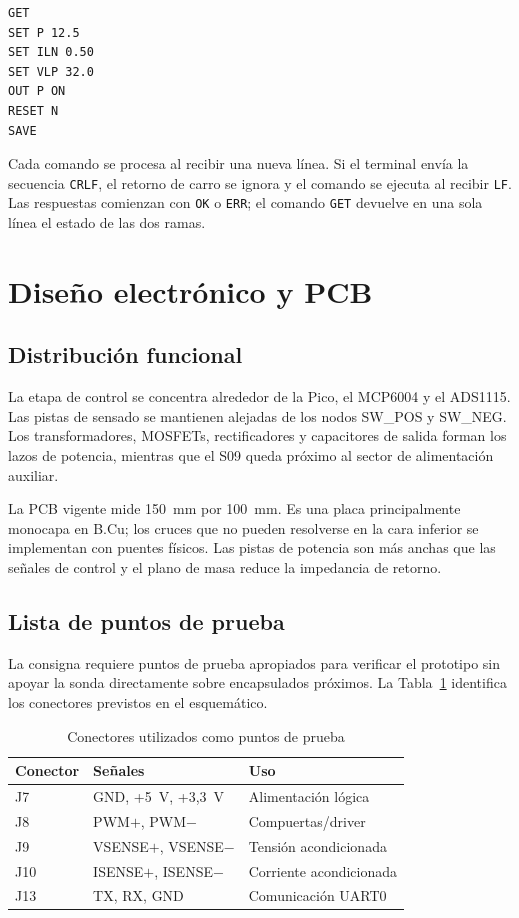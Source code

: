 \documentclass[conference]{IEEEtran}
\begin{document}
\begin{lstlisting}[caption={Ejemplos de comunicación con otra placa.}]
GET
SET P 12.5
SET ILN 0.50
SET VLP 32.0
OUT P ON
RESET N
SAVE
\end{lstlisting}

Cada comando se procesa al recibir una nueva línea. Si el terminal envía la secuencia \texttt{CRLF}, el retorno de carro se ignora y el comando se ejecuta al recibir \texttt{LF}. Las respuestas comienzan con \texttt{OK} o \texttt{ERR}; el comando \texttt{GET} devuelve en una sola línea el estado de las dos ramas.

\section{Diseño electrónico y PCB}

\subsection{Distribución funcional}

La etapa de control se concentra alrededor de la Pico, el MCP6004 y el ADS1115. Las pistas de sensado se mantienen alejadas de los nodos SW\_POS y SW\_NEG. Los transformadores, MOSFETs, rectificadores y capacitores de salida forman los lazos de potencia, mientras que el S09 queda próximo al sector de alimentación auxiliar.

La PCB vigente mide 150~mm por 100~mm. Es una placa principalmente monocapa en B.Cu; los cruces que no pueden resolverse en la cara inferior se implementan con puentes físicos. Las pistas de potencia son más anchas que las señales de control y el plano de masa reduce la impedancia de retorno.

\subsection{Lista de puntos de prueba}

La consigna requiere puntos de prueba apropiados para verificar el prototipo sin apoyar la sonda directamente sobre encapsulados próximos. La Tabla~\ref{tab:testpoints} identifica los conectores previstos en el esquemático.

\begin{table}[!t]
\caption{Conectores utilizados como puntos de prueba}
\label{tab:testpoints}
\centering
\footnotesize
\begin{tabular}{@{}lll@{}}
\toprule
\textbf{Conector} & \textbf{Señales} & \textbf{Uso} \\
\midrule
J7 & GND, +5~V, +3,3~V & Alimentación lógica \\
J8 & PWM$+$, PWM$-$ & Compuertas/driver \\
J9 & VSENSE$+$, VSENSE$-$ & Tensión acondicionada \\
J10 & ISENSE$+$, ISENSE$-$ & Corriente acondicionada \\
J13 & TX, RX, GND & Comunicación UART0 \\
\bottomrule
\end{tabular}
\end{table}
\end{document}
